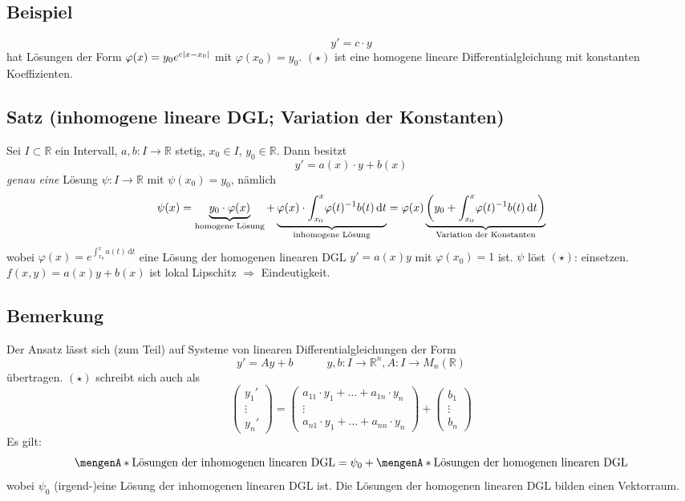 \subsection[Beispiel: homogene, lineare DGL mit konstanten Koeffizienten]{Beispiel} %
\label{sub:24}
\[
	y' = c \cdot y \tag{$\star$}
\]
hat Lösungen der Form $\varphi(x)= y_0 e^{c \abs*{x-x_0} }$ mit $\varphi(x_0)=y_0$. $(\star)$ ist eine homogene lineare Differentialgleichung mit konstanten 
Koeffizienten. 

\subsection{Satz (inhomogene lineare DGL; Variation der Konstanten)} %
\label{sub:25}
Sei $I \subset \mathds{R}$ ein Intervall, $a,b : I \to \mathds{R}$ stetig, $x_0 \in I$, $y_0 \in \mathds{R}$. Dann besitzt 
\[
	y' = a(x)\cdot y + b(x) \tag{$\star$}
\]
\emph{genau eine} Lösung $\psi : I \to \mathds{R}$ mit $\psi(x_0)=y_0$, nämlich
\[
	\psi(x) = \underbrace{y_0 \cdot \varphi(x)}_{\text{homogene Lösung}}+ \underbrace{\varphi(x) \cdot \int_{x_0} ^{x} \! \varphi(t) ^{-1} b(t)  \,
	 \mathrm{d}t}_{\text{inhomogene Lösung}} = \varphi(x) \underbrace{\enbrace*{y_0 + \int_{x_0} ^{x} \! 
	\varphi(t) ^{-1} b(t)  \, \mathrm{d}t}}_{\text{Variation der Konstanten}} 
\]
wobei $\varphi(x)= e^{\int_{x_0} ^{x} \! a(t)  \, \mathrm{d}t}$ eine Lösung der homogenen linearen DGL $y'=a(x)y$ mit $\varphi(x_0)= 1$ ist.
$\psi$ löst $(\star)$: einsetzen. 
$f(x,y)= a(x)y + b(x)$ ist lokal Lipschitz $\Rightarrow $ Eindeutigkeit. \bewende

\subsection[Bemerkung: Variation der Konstanten bei System von linearen DGL]{Bemerkung} %
\label{sub:26}
Der Ansatz lässt sich (zum Teil) auf Systeme von linearen Differentialgleichungen der Form
\[
	y' = Ay+b \qquad \quad y,b : I \to \mathds{R}^n, A : I \to M_n(\mathds{R}) \tag{$\star$}
\]
übertragen. $(\star)$ schreibt sich auch als
\[
	\begin{pmatrix}
		y_1' \\ \vdots \\ y_n'
	\end{pmatrix} = \begin{pmatrix}
		a_{11}\cdot y_1 + \ldots + a_{1n}\cdot y_n \\
		\vdots \\
		a_{n1}\cdot y_1 + \ldots + a_{nn}\cdot y_n
	\end{pmatrix} + \begin{pmatrix}
		b_1 \\ \vdots \\ b_n
	\end{pmatrix}
\]
Es gilt: 
\[
	\set{\text{Lösungen der inhomogenen linearen DGL}} = \psi_0 + \set{\text{Lösungen der homogenen linearen DGL}}  
\]
wobei $\psi_0$ (irgend-)eine Lösung der inhomogenen linearen DGL ist. Die Lösungen der homogenen linearen DGL bilden einen Vektorraum.

